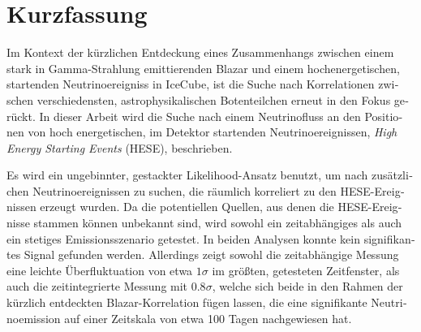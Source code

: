 \section*{Kurzfassung}
\begin{german}
Im Kontext der kürzlichen Entdeckung eines Zusammenhangs zwischen einem stark in Gamma-Strahlung emittierenden Blazar und einem hochenergetischen, startenden Neutrinoereigniss in IceCube, ist die Suche nach Korrelationen zwischen verschiedensten, astrophysikalischen Botenteilchen erneut in den Fokus gerückt.
In dieser Arbeit wird die Suche nach einem Neutrinofluss an den Positionen von hoch energetischen, im Detektor startenden Neutrinoereignissen, \emph{High Energy Starting Events} (HESE), beschrieben.


Es wird ein ungebinnter, gestackter Likelihood-Ansatz benutzt, um nach zusätzlichen Neutrinoereignissen zu suchen, die räumlich korreliert zu den HESE-Ereignissen erzeugt wurden.
Da die potentiellen Quellen, aus denen die HESE-Ereignisse stammen können unbekannt sind, wird sowohl ein zeitabhängiges als auch ein stetiges Emissionsszenario getestet.
In beiden Analysen konnte kein signifikantes Signal gefunden werden.
Allerdings zeigt sowohl die zeitabhängige Messung eine leichte Überfluktuation von etwa $1\sigma$ im größten, getesteten Zeitfenster, als auch die zeitintegrierte Messung mit $0.8\sigma$, welche sich beide in den Rahmen der kürzlich entdeckten Blazar-Korrelation fügen lassen, die eine signifikante Neutrinoemission auf einer Zeitskala von etwa 100 Tagen nachgewiesen hat.
\end{german}